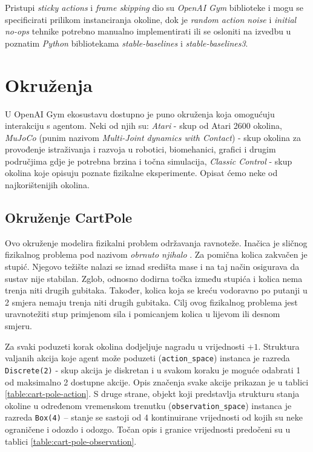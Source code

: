 Pristupi \textit{sticky actions} i \textit{frame skipping} dio su \textit{OpenAI Gym} biblioteke i mogu se specificirati prilikom instanciranja okoline, dok je \textit{random action noise} i \textit{initial no-ops} tehnike potrebno manualno implementirati ili se osloniti na izvedbu u poznatim \textit{Python} bibliotekama \textit{stable-baselines} i \textit{stable-baselines3}.

\section{Okruženja}

U OpenAI Gym ekosustavu dostupno je puno okruženja koja omogućuju interakciju s agentom. Neki od njih su: \textit{Atari} - skup od Atari 2600 okolina, \textit{MuJoCo} (punim nazivom \textit{Multi-Joint dynamics with Contact}) - skup okolina za provođenje istraživanja i razvoja u robotici, biomehanici, grafici i drugim područjima gdje je potrebna brzina i točna simulacija, \textit{Classic Control} - skup okolina koje opisuju poznate fizikalne eksperimente. Opisat ćemo neke od najkorištenijih okolina.

\subsection{Okruženje CartPole}

Ovo okruženje modelira fizikalni problem održavanja ravnoteže. Inačica je sličnog fizikalnog problema pod nazivom \textit{obrnuto njihalo} . Za pomična kolica zakvačen je stupić. Njegovo težište nalazi se iznad središta mase i na taj način osigurava da sustav nije stabilan.  Zglob, odnosno dodirna točka između stupića i kolica nema trenja niti drugih gubitaka. Također, kolica koja se kreću vodoravno po putanji u 2 smjera nemaju trenja niti drugih gubitaka. Cilj ovog fizikalnog problema jest uravnotežiti stup primjenom sila i pomicanjem kolica u lijevom ili desnom smjeru.

Za svaki poduzeti korak okolina dodjeljuje nagradu u vrijednosti $+1$. Struktura valjanih akcija koje agent može poduzeti (\texttt{action_space}) instanca je razreda \texttt{Disc\-rete(2)} - skup akcija je diskretan i u svakom koraku je moguće odabrati 1 od maksimalno 2 dostupne akcije. Opis značenja svake akcije prikazan je u tablici \ref{table:cart-pole-action}. S druge strane, objekt koji predstavlja strukturu stanja okoline u određenom vremenskom trenutku (\texttt{observation_space}) instanca je razreda \texttt{Box(4)} – stanje se sastoji od 4 kontinuirane vrijednosti od kojih su neke ograničene i odozdo i odozgo. Točan opis i granice vrijednosti predočeni su u tablici \ref{table:cart-pole-observation}.

